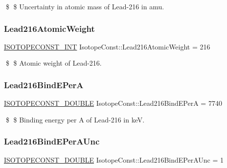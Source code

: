 \$ \$ Uncertainty in atomic mass of Lead-\/216 in amu. \mbox{\label{group___isotope_const-_lead-_pb216_ga8d92c9089e934fee46d815cb3c58e681}} 
\subsubsection{\texorpdfstring{Lead216\+Atomic\+Weight}{Lead216AtomicWeight}}
{\footnotesize\ttfamily \mbox{\hyperlink{group___isotope_const-_macros_ga5f18360b3e99483a35c32d789e62621c}{I\+S\+O\+T\+O\+P\+E\+C\+O\+N\+S\+T\+\_\+\+I\+NT}} Isotope\+Const\+::\+Lead216\+Atomic\+Weight = 216}

\$ \$ Atomic weight of Lead-\/216. \mbox{\label{group___isotope_const-_lead-_pb216_gad0d8078f4262509034d88ad0c343ea0c}} 
\subsubsection{\texorpdfstring{Lead216\+Bind\+E\+PerA}{Lead216BindEPerA}}
{\footnotesize\ttfamily \mbox{\hyperlink{group___isotope_const-_macros_ga8f45a7272ce02c0b4c65c44636ed719a}{I\+S\+O\+T\+O\+P\+E\+C\+O\+N\+S\+T\+\_\+\+D\+O\+U\+B\+LE}} Isotope\+Const\+::\+Lead216\+Bind\+E\+PerA = 7740}

\$ \$ Binding energy per A of Lead-\/216 in keV. \mbox{\label{group___isotope_const-_lead-_pb216_ga6bdf24a5d6fa023e9dddf1750de89548}} 
\subsubsection{\texorpdfstring{Lead216\+Bind\+E\+Per\+A\+Unc}{Lead216BindEPerAUnc}}
{\footnotesize\ttfamily \mbox{\hyperlink{group___isotope_const-_macros_ga8f45a7272ce02c0b4c65c44636ed719a}{I\+S\+O\+T\+O\+P\+E\+C\+O\+N\+S\+T\+\_\+\+D\+O\+U\+B\+LE}} Isotope\+Const\+::\+Lead216\+Bind\+E\+Per\+A\+Unc = 1}

